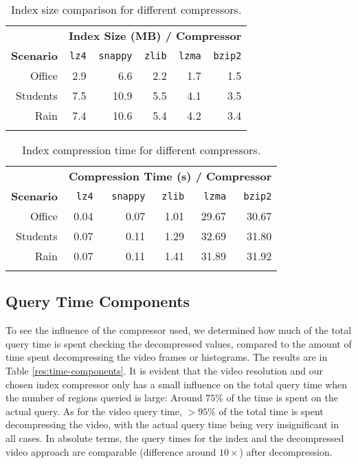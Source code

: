 \begin{table}
    \caption{Index size comparison for different compressors.}\label{res:compressor-space}
	\centering
    \begin{tabular}{ r rrrrr }
		~ & \multicolumn{5}{c}{\textbf{Index Size (MB) / Compressor}}\\
		\cline{2-6}
	    \textbf{Scenario} & \texttt{lz4} & \texttt{snappy} & \texttt{zlib} & \texttt{lzma} & \texttt{bzip2} \\  \hline\noalign{\smallskip}
		Office   		& 2.9 &  6.6 & 2.2 & 1.7 & 1.5   \\
	    Students		& 7.5 & 10.9 & 5.5 & 4.1 & 3.5  \\
	    Rain     		& 7.4 & 10.6 & 5.4 & 4.2 & 3.4  \\\noalign{\smallskip}
        \hline
	   \end{tabular}
\end{table}

\begin{table}
    \caption{Index compression time for different compressors.}\label{res:compressor-time}
	\centering
    \begin{tabular}{ r rrrrr }
		~ & \multicolumn{5}{c}{\textbf{Compression Time (s) / Compressor}}\\
		\cline{2-6}
	    \textbf{Scenario} & \texttt{lz4} & \texttt{snappy} & \texttt{zlib} & \texttt{lzma} & \texttt{bzip2} \\  \hline\noalign{\smallskip}
		Office   		& 0.04 & 0.07 & 1.01 & 29.67 & 30.67   \\
	    Students		& 0.07 & 0.11 & 1.29 & 32.69 & 31.80  \\
	    Rain     		& 0.07 & 0.11 & 1.41 & 31.89 & 31.92  \\\noalign{\smallskip} 
        \hline
	   \end{tabular}
\end{table}

\subsection{Query Time Components}\label{sec:query-time-components}
To see the influence of the compressor used, we determined how much of the total query time is spent checking the decompressed values, compared to the amount of time spent decompressing the video frames or histograms. The results are in Table \ref{res:time-components}. It is evident that the video resolution and our chosen index compressor only has a small influence on the total query time when the number of regions queried is large: Around $75\%$ of the time is spent on the actual query. As for the video query time, $>95\%$ of the total time is spent decompressing the video, with the actual query time being very insignificant in all cases. In absolute terms, the query times for the index and the decompressed video approach are comparable (difference around $10\times$) after decompression.


